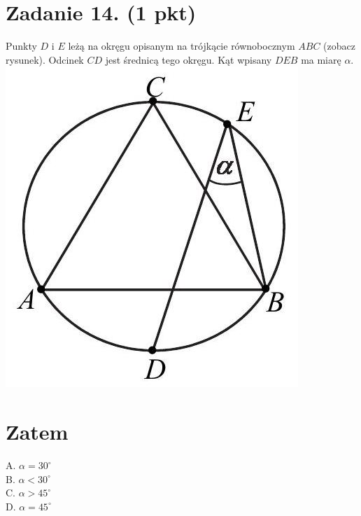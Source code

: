 \documentclass[10pt]{article}
\begin{document}
\section*{Zadanie 14. (1 pkt)}
Punkty \(D\) i \(E\) leżą na okręgu opisanym na trójkącie równobocznym \(A B C\) (zobacz rysunek). Odcinek \(C D\) jest średnicą tego okręgu. Kąt wpisany \(D E B\) ma miarę \(\alpha\).\\
\includegraphics[max width=\textwidth, center]{2024_11_21_d51d653f4fe4a5bb0c33g-06}

\section*{Zatem}
A. \(\alpha=30^{\circ}\)\\
B. \(\alpha<30^{\circ}\)\\
C. \(\alpha>45^{\circ}\)\\
D. \(\alpha=45^{\circ}\)
\end{document}
